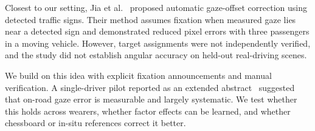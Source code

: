 Closest to our setting, Jia et al.~\cite{jia2018gaze}
proposed automatic gaze-offset correction using detected
traffic signs. Their method assumes fixation when measured
gaze lies near a detected sign and demonstrated reduced
pixel errors with three passengers in a moving vehicle.
However, target assignments were not independently verified,
and the study did not establish angular accuracy on held-out
real-driving scenes.

We build on this idea with explicit fixation announcements and
manual verification. A single-driver pilot reported as an extended
abstract~\cite{engel2026laboratoryToRoad} suggested that on-road
gaze error is measurable and largely systematic. We test whether
this holds across wearers, whether factor effects can be learned,
and whether chessboard or in-situ references correct it better.

